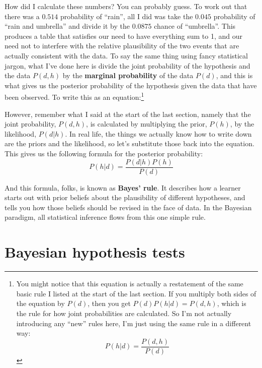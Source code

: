 \documentclass[
  a4paper,
]{book}
\begin{document}
How did I calculate these numbers? You can probably guess. To work out
that there was a \(0.514\) probability of ``rain'', all I did was take
the \(0.045\) probability of ``rain and umbrella'' and divide it by the
\(0.0875\) chance of ``umbrella''. This produces a table that satisfies
our need to have everything sum to 1, and our need not to interfere with
the relative plausibility of the two events that are actually consistent
with the data. To say the same thing using fancy statistical jargon,
what I've done here is divide the joint probability of the hypothesis
and the data \(P(d, h)\) by the \textbf{marginal probability} of the
data \(P(d)\), and this is what gives us the posterior probability of
the hypothesis given the data that have been observed. To write this as
an equation:\footnote{You might notice that this equation is actually a
  restatement of the same basic rule I listed at the start of the last
  section. If you multiply both sides of the equation by \(P(d)\), then
  you get \(P(d)P(h|d) = P(d, h)\), which is the rule for how joint
  probabilities are calculated. So I'm not actually introducing any
  ``new'' rules here, I'm just using the same rule in a different way:
  \[P(h|d)=\frac{P(d,h)}{P(d)}\]}

However, remember what I said at the start of the last section, namely
that the joint probability, \(P(d, h)\), is calculated by multiplying
the prior, \(P(h)\), by the likelihood, \(P(d|h)\). In real life, the
things we actually know how to write down are the priors and the
likelihood, so let's substitute those back into the equation. This gives
us the following formula for the posterior probability:
\[P(h|d)=\frac{P(d|h)P(h)}{P(d)}\]

And this formula, folks, is known as \textbf{Bayes' rule}. It describes
how a learner starts out with prior beliefs about the plausibility of
different hypotheses, and tells you how those beliefs should be revised
in the face of data. In the Bayesian paradigm, all statistical inference
flows from this one simple rule.

\hypertarget{bayesian-hypothesis-tests}{%
\section{Bayesian hypothesis tests}\label{bayesian-hypothesis-tests}}
\end{document}
